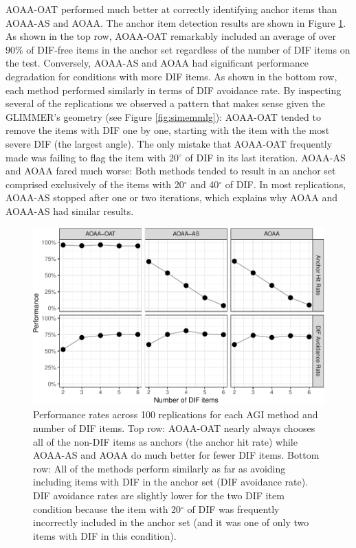 \documentclass[
  english,
  man,floatsintext]{apa6}
\begin{document}
AOAA-OAT performed much better at correctly identifying anchor items than AOAA-AS and AOAA. The anchor item detection results are shown in Figure \ref{fig:anchorfalse}. As shown in the top row, AOAA-OAT remarkably included an average of over \(90\%\) of DIF-free items in the anchor set regardless of the number of DIF items on the test. Conversely, AOAA-AS and AOAA had significant performance degradation for conditions with more DIF items. As shown in the bottom row, each method performed similarly in terms of DIF avoidance rate. By inspecting several of the replications we observed a pattern that makes sense given the GLIMMER's geometry (see Figure \ref{fig:simemmlg}): AOAA-OAT tended to remove the items with DIF one by one, starting with the item with the most severe DIF (the largest angle). The only mistake that AOAA-OAT frequently made was failing to flag the item with 20\(^\circ\) of DIF in its last iteration. AOAA-AS and AOAA fared much worse: Both methods tended to result in an anchor set comprised exclusively of the items with 20\(^\circ\) and 40\(^\circ\) of DIF. In most replications, AOAA-AS stopped after one or two iterations, which explains why AOAA and AOAA-AS had similar results.

\begin{figure}[h]

{\centering \includegraphics{paper_apa_files/figure-latex/anchorfalse-1} 

}

\caption{Performance rates across 100 replications for each AGI method and number of DIF items. Top row: AOAA-OAT nearly always chooses all of the non-DIF items as anchors (the anchor hit rate) while AOAA-AS and AOAA do much better for fewer DIF items. Bottom row: All of the methods perform similarly as far as avoiding including items with DIF in the anchor set (DIF avoidance rate). DIF avoidance rates are slightly lower for the two DIF item condition because the item with 20$^\circ$ of DIF was frequently incorrectly included in the anchor set (and it was one of only two items with DIF in this condition).}\label{fig:anchorfalse}
\end{figure}
\end{document}
